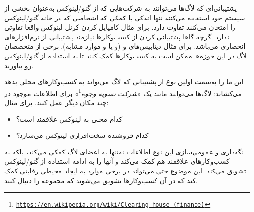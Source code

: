 پشتیبانی‌ای که لاگ‌ها می‌توانند به شرکت‌هایی که از گنو/لینوکس
به‌عنوان بخشی از سیستم خود استفاده می‌کنند تنها اندکی با کمکی
که اشخاصی که در خانه گنو/لینوکس را امتحان می‌کنند تفاوت دارد.
برای مثال کامپایل کردن کرنل لینوکس واقعا تفاوتی ندارد.
گرچه گاها پشتیبانی کردن از کسب‌وکار‌ها نیازمند پشتیبانی از
نرم‌افزارهای انحصاری می‌باشد. برای مثال دیتابیس‌های
 و 
(و یا
و موارد مشابه).
برخی از متخصصان لاگ در این حوزه‌ها ممکن است به کسب‌وکار‌ها کمک کنند
تا به استفاده از گنو/لینوکس رو بیاورند.

این ما را به‌سمت اولین نوع از پشتیبانی که لاگ می‌تواند به
کسب‌وکار‌های محلی بدهد می‌کشاند: لاگ‌ها می‌توانند مانند یک
«\emph{شرکت تسویه وجوه}\footnote{\texttt{\url{https://en.wikipedia.org/wiki/Clearing_house_(finance)}}}»
برای اطلاعات موجود در چند مکان دیگر عمل کنند. برای مثال:

\begin{itemize}
\item
کدام  محلی به لینوکس علاقمند است؟
\item
کدام فروشنده سخت‌افزاری  لینوکس می‌سازد؟
\end{itemize}


نگه‌داری و عمومی‌سازی این نوع اطلاعات نه‌تنها به اعضای لاگ کمکی می‌کند،
بلکه به کسب‌وکارهای علاقمند هم کمک می‌کند و آنها را به ادامه استفاده از
گنو/لینوکس تشویق می‌کند.
این موضوع حتی می‌تواند در برخی موارد به ایجاد محیطی رقابتی کمک کند که
در آن کسب‌وکار‌ها تشویق می‌شوند که مجموعه را دنبال کنند.

